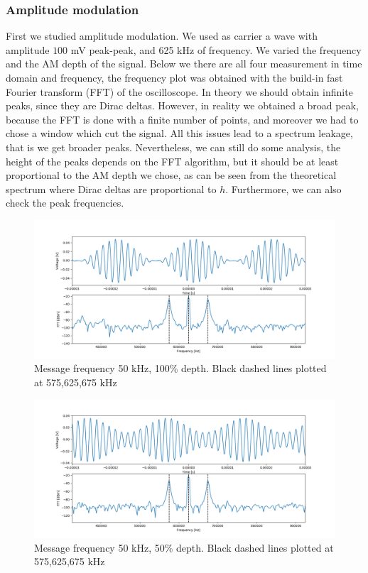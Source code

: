 \documentclass[a4paper,10pt]{article}
\begin{document}
\subsubsection{Amplitude modulation}
First we studied amplitude modulation. We used as carrier a wave with amplitude $100$ mV peak-peak, and 625 kHz of frequency. We varied the frequency and the AM depth of the signal. Below we there are all four measurement in time domain and frequency, the frequency plot was obtained with the build-in fast Fourier transform (FFT) of the oscilloscope. In theory we should obtain infinite peaks, since they are Dirac deltas. However, in reality we obtained a broad peak, because the FFT is done with a finite number of points, and moreover we had to chose a window which cut the signal. All this issues lead to a spectrum leakage, that is we get broader peaks. Nevertheless, we can still do some analysis, the height of the peaks depends on the FFT algorithm, but it should be at least proportional to the AM depth we chose, as can be seen from the theoretical spectrum where Dirac deltas are proportional to $h$. Furthermore, we can also check the peak frequencies.
\begin{figure}[H]
\centering
\includegraphics[width=\textwidth]{amp1}
\caption{Message frequency 50 kHz, 100\% depth. Black dashed lines plotted at 575,625,675 kHz}\label{1}
\end{figure}
\begin{figure}[H]
\centering
\includegraphics[width=\textwidth]{amp2}
\caption{Message frequency 50 kHz, 50\% depth. Black dashed lines plotted at 575,625,675 kHz}\label{2}
\end{figure}
\end{document}
